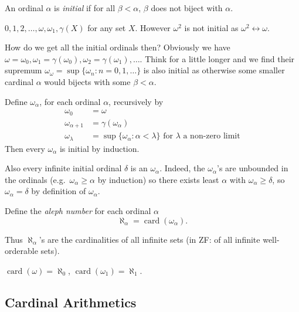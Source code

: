 \documentclass[a4paper]{article}
\DeclareMathOperator{\card}{card}
\newcommand*{\biject}{\leftrightarrow}
\begin{document}
\begin{definition}
  An ordinal \(\alpha\) is \emph{initial} if for all \(\beta < \alpha\), \(\beta\) does not biject with \(\alpha\).
\end{definition}

\begin{eg}
  \(0, 1, 2, \dots, \omega, \omega_1, \gamma(X)\) for any set \(X\). However \(\omega^2\) is not initial as \(\omega^2 \biject \omega\).
\end{eg}

How do we get all the initial ordinals then? Obviously we have \(\omega = \omega_0, \omega_1 = \gamma(\omega_0), \omega_2 = \gamma(\omega_1), \dots\). Think for a little longer and we find their supremum \(\omega_\omega = \sup \{\omega_n: n = 0, 1, \dots\}\) is also initial as otherwise some smaller cardinal \(\alpha\) would bijects with some \(\beta < \alpha\).

Define \(\omega_\alpha\), for each ordinal \(\alpha\), recursively by
\begin{align*}
  \omega_0 &= \omega \\
  \omega_{\alpha + 1} &= \gamma(\omega_\alpha) \\
  \omega_\lambda &= \sup \{\omega_\alpha: \alpha < \lambda\} \text{ for \(\lambda\) a non-zero limit}
\end{align*}
Then every \(\omega_\alpha\) is initial by induction.

Also every infinite initial ordinal \(\delta\) is an \(\omega_\alpha\). Indeed, the \(\omega_\alpha\)'s are unbounded in the ordinals (e.g.\ \(\omega_\alpha \geq \alpha\) by induction) so there exists least \(\alpha\) with \(\omega_\alpha \geq \delta\), so \(\omega_\alpha = \delta\) by definition of \(\omega_\alpha\).

\begin{definition}\index{\(\aleph_\alpha\)}
  Define the \emph{aleph number} for each ordinal \(\alpha\)
  \[
    \aleph_\alpha = \card(\omega_\alpha).
  \]
\end{definition}

Thus \(\aleph_\alpha\)'s are the cardinalities of all infinite sets (in ZF: of all infinite well-orderable sets).

\begin{eg}
  \(\card(\omega) = \aleph_0\), \(\card(\omega_1) = \aleph_1\).
\end{eg}

\subsection{Cardinal Arithmetics}
\end{document}
